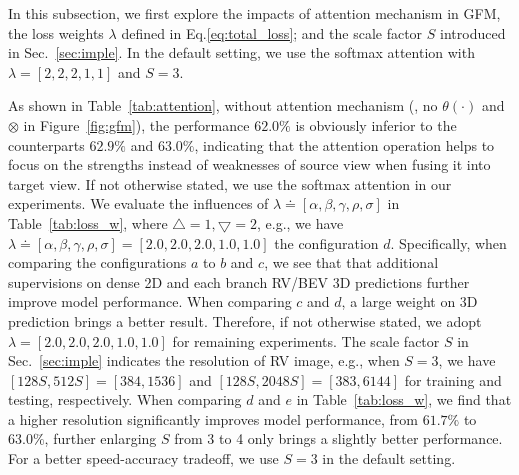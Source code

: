 In this subsection, we first explore the impacts of attention mechanism in GFM, the loss weights $\lambda$ defined in Eq.\ref{eq:total_loss}; and the scale factor $S$ introduced in Sec.~\ref{sec:imple}. In the default setting, we use the softmax attention with $\lambda=[2,2,2,1,1]$ and $S=3$.

As shown in Table~\ref{tab:attention}, without attention mechanism (\ie, no $\theta(\cdot)$ and $\otimes$ in Figure~\ref{fig:gfm}), the performance $62.0\%$ is obviously inferior to the counterparts $62.9\%$ and $63.0\%$, indicating that the attention operation helps to focus on the strengths instead of weaknesses of source view when fusing it into target view. If not otherwise stated, we use the softmax attention in our experiments.
We evaluate the influences of $\lambda \doteq[\alpha, \beta, \gamma,\rho, \sigma]$ in Table~\ref{tab:loss_w}, where $\bigtriangleup=1, \bigtriangledown=2$, e.g., we have $\lambda \doteq[\alpha, \beta, \gamma,\rho, \sigma]=[2.0,2.0,2.0,1.0,1.0]$ the configuration $d$. Specifically, when comparing the configurations $a$ to $b$ and $c$, we see that that additional supervisions on dense 2D and each branch RV/BEV 3D predictions further improve model performance. When comparing $c$ and $d$, a large weight on 3D prediction  brings a better result. Therefore, if not otherwise stated, we adopt $\lambda=[2.0,2.0,2.0,1.0,1.0]$ for remaining experiments. The scale factor $S$ in Sec.~\ref{sec:imple} indicates the resolution of RV image, e.g., when $S=3$, we have $[128S, 512S]=[384, 1536]$ and $[128S, 2048S]=[383, 6144]$ for training and testing, respectively. When comparing $d$ and $e$ in Table~\ref{tab:loss_w}, we find that a higher resolution significantly improves model performance, from $61.7\%$ to $63.0\%$, further enlarging $S$ from 3 to 4 only brings a slightly better performance. For a better speed-accuracy tradeoff, we use $S=3$ in the default setting.




